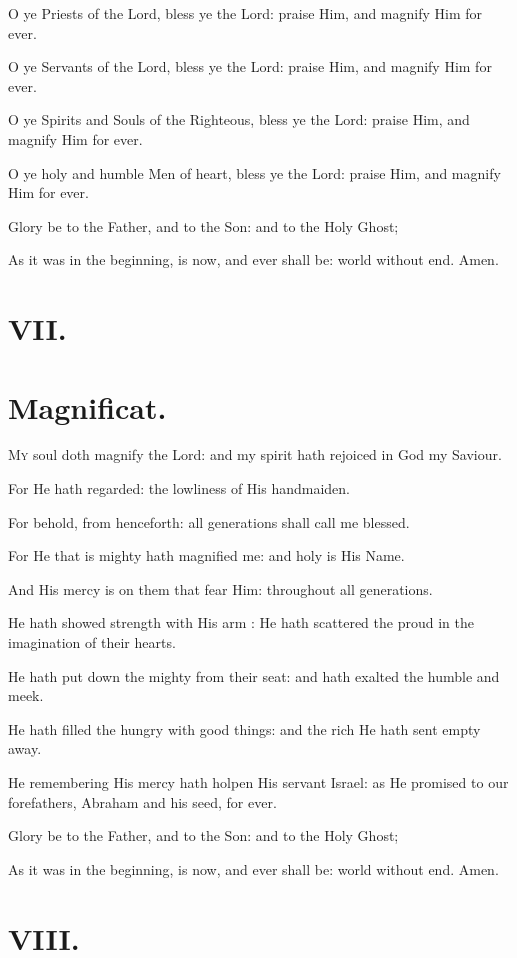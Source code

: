 O ye Priests of the Lord, bless ye the Lord: praise Him, and magnify Him for ever.

O ye Servants of the Lord, bless ye the Lord: praise Him, and magnify Him for ever.

O ye Spirits and Souls of the Righteous, bless ye the Lord: praise Him, and magnify Him for ever.

O ye holy and humble Men of heart, bless ye the Lord: praise Him, and magnify Him for ever.

Glory be to the Father, and to the Son: and to the Holy Ghost;

As it was in the beginning, is now, and ever shall be: world without end. Amen.

\section*{VII.}
\section*{Magnificat.}

\lettrine{M}{y} soul doth magnify the Lord: and my spirit hath rejoiced in God my Saviour.

For He hath regarded: the lowliness of His handmaiden.

For behold, from henceforth: all generations shall call me blessed.

For He that is mighty hath magnified me: and holy is His Name.

And His mercy is on them that fear Him: throughout all generations.

He hath showed strength with His arm : He hath scattered the proud in the imagination of their hearts.

He hath put down the mighty from their seat: and hath exalted the humble and meek.

He hath filled the hungry with good things: and the rich He hath sent empty away.

He remembering His mercy hath holpen His servant Israel: as He promised to our forefathers, Abraham and his seed, for ever.

Glory be to the Father, and to the Son: and to the Holy Ghost;

As it was in the beginning, is now, and ever shall be: world without end. Amen.

\section*{VIII.}
